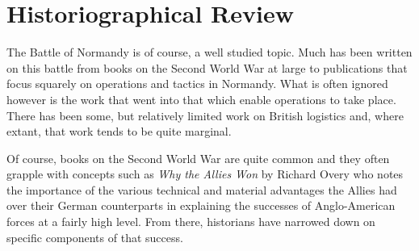 \documentclass[noraggedright]{turabian-researchpaper}
\begin{document}
\section{Historiographical Review}










The Battle of Normandy is of course, a well studied topic.  Much has been
written on this battle from books on the Second World War at large to 
publications that focus squarely on operations and tactics in Normandy.  What
is often ignored however is the work that went into that which enable 
operations to take place.  There has been some, but relatively limited work
on British logistics and, where extant, that work tends to be quite marginal.



Of course, books on the Second World War are quite common and they often
grapple with concepts such as \textit{Why the Allies Won} by Richard Overy
who notes the importance of the various technical and material advantages the 
Allies had over their German counterparts in explaining the successes of 
Anglo-American forces at a fairly high level.%
From there, historians have narrowed down on specific components of that
success.  
\end{document}
